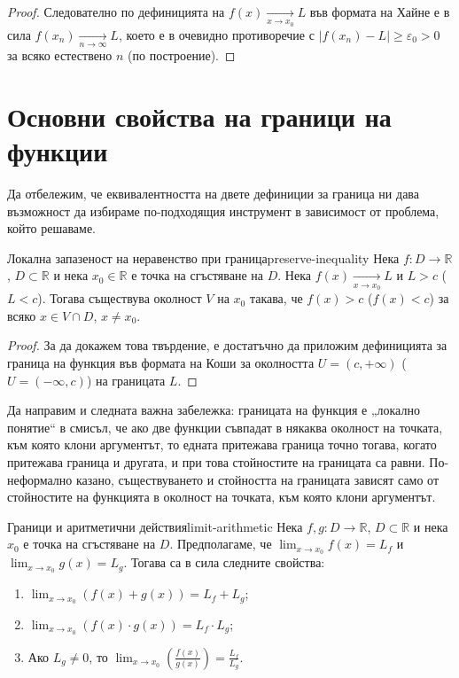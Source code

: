 \begin{proof}
Следователно по дефиницията на $f(x) \xrightarrow[x \to x_0]{} L$ във формата на Хайне е в сила $f(x_n) \xrightarrow[n \to \infty]{} L$, което е в очевидно противоречие с $|f(x_n) - L| \ge \varepsilon_0 > 0$ за всяко естествено $n$ (по построение).
\end{proof}

\section{Основни свойства на граници на функции}

Да отбележим, че еквивалентността на двете дефиниции за граница ни дава възможност да избираме по-подходящия инструмент в зависимост от проблема, който решаваме.

\begin{theorem}{Локална запазеност на неравенство при граница}{preserve-inequality}
Нека $f : D \to \mathbb{R}$, $D \subset \mathbb{R}$ и нека $x_0 \in \mathbb{R}$ е точка на сгъстяване на $D$. Нека $f(x) \xrightarrow[x \to x_0]{} L$ и $L > c$ ($L < c$). Тогава съществува околност $V$ на $x_0$ такава, че $f(x) > c$ ($f(x) < c$) за всяко $x \in V \cap D$, $x \neq x_0$.
\end{theorem}

\begin{proof}
За да докажем това твърдение, е достатъчно да приложим дефиницията за граница на функция във формата на Коши за околността $U = (c, +\infty)$ ($U = (-\infty, c)$) на границата $L$.
\end{proof}

Да направим и следната важна забележка: границата на функция е „локално понятие“ в смисъл, че ако две функции съвпадат в някаква околност на точката, към която клони аргументът, то едната притежава граница точно тогава, когато притежава граница и другата, и при това стойностите на границата са равни. По-неформално казано, съществуването и стойността на границата зависят само от стойностите на функцията в околност на точката, към която клони аргументът.

\begin{theorem}{Граници и аритметични действия}{limit-arithmetic}
Нека $f, g : D \to \mathbb{R}$, $D \subset \mathbb{R}$ и нека $x_0$ е точка на сгъстяване на $D$. Предполагаме, че $\lim_{x \to x_0} f(x) = L_f$ и $\lim_{x \to x_0} g(x) = L_g$. Тогава са в сила следните свойства:
\begin{enumerate}
    \item $\lim_{x \to x_0} (f(x) + g(x)) = L_f + L_g$;
    \item $\lim_{x \to x_0} (f(x) \cdot g(x)) = L_f \cdot L_g$;
    \item Ако $L_g \neq 0$, то $\lim_{x \to x_0} \left( \frac{f(x)}{g(x)} \right) = \frac{L_f}{L_g}$.
\end{enumerate}
\end{theorem}

